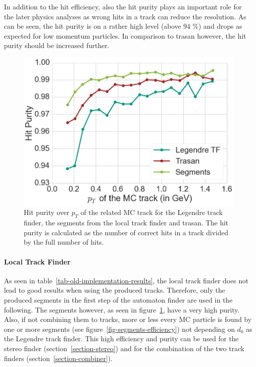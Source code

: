 In addition to the hit efficiency, also the hit purity plays an important role for the later physics analyses as wrong hits in a track can reduce the resolution. As can be seen, the hit purity is on a rather high level (above 94 \%) and drops as expected for low momentum particles. In comparison to trasan however, the hit purity should be increased further.

\begin{figure}
  \centering
  \includegraphics[width=0.7\linewidth]{figures/workflow/segment_purity.png}
  \caption{Hit purity over $p_T$ of the related MC track for the Legendre track finder, the segments from the local track finder and trasan. The hit purity is calculated as the number of correct hits in a track divided by the full number of hits.}
  \label{fig-legendre-purity}
\end{figure}


\paragraph{Local Track Finder}

As seen in table~\ref{tab-old-implementation-results}, the local track finder does not lead to good results when using the produced tracks. Therefore, only the produced segments in the first step of the automaton finder are used in the following. The segments however, as seen in figure~\ref{fig-legendre-purity}, have a very high purity. Also, if not combining them to tracks, more or less every MC particle is found by one or more segments (see figure~\ref{fig-segments-efficiency}) not depending on $d_0$ as the Legendre track finder. This high efficiency and purity can be used for the stereo finder (section~\ref{section-stereo}) and for the combination of the two track finders (section~\ref{section-combiner}).

